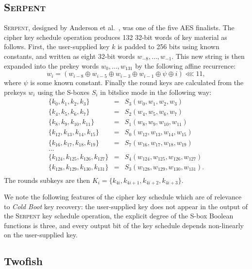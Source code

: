 \documentclass{llncs}
\newcommand{\Serpent}{\textsc{Serpent}\xspace}
\newcommand{\coldboot}{\emph{Cold Boot}\xspace}
\begin{document}
\subsection{\Serpent}
\Serpent, designed by Anderson et al.\ \cite{biham-anderson-knudsen-fse98}, was one of the five AES finalists. The cipher key schedule operation
produces 132 32-bit words of key material as follows. First, the user-supplied key $k$ is padded to 256 bits using known constants, and written as eight 32-bit words $w_{−8},\dots , w_{−1}$. This new string
is then expanded into the prekey words $w_0 ,\dots , w_{131}$ by the following affine recurrence:
$$w_i = (w_{i−8} \oplus w_{i−5} \oplus w_{i−3} \oplus w_{i−1} \oplus \psi \oplus i) \lll 11,$$ 
where $\psi$ is some known constant. Finally the round keys are calculated from the prekeys $w_i$ using the S-boxes $S_i$ in bitslice mode in the following way:
\begin{eqnarray*}
\{k_{ 0} , k_{ 1} , k_{ 2} , k_{ 3} \} &=& S_3(w_0 , w_1 , w_2 , w_3)\\
\{k_{ 4} , k_{ 5} , k_{ 6} , k_{ 7} \} &=& S_2(w_4 , w_5 , w_6 , w_7 )\\
\{k_{ 8} , k_{ 9} , k_{10} , k_{11} \} &=& S_1(w_8 , w_9 , w_{10} , w_{11} )\\
\{k_{12} , k_{13} , k_{14} , k_{15} \} &=& S_0(w_{12} , w_{13} , w_{14} , w_{15} )\\
\{k_{16} , k_{17} , k_{18} , k_{19} \} &=& S_7(w_{16} , w_{17} , w_{18} , w_{19} )\\
\dots & \\                                                                           
\{k_{124} , k_{125} , k_{126} , k_{127} \} &=& S_4 (w_{124} , w_{125} , w_{126} , w_{127} )\\
\{k_{128} , k_{129} , k_{130} , k_{131} \} &=& S_3 (w_{128} , w_{129} , w_{130} , w_{131} ).\\
\end{eqnarray*}
The rounds subkeys are then $K_i = \{k_{4i} , k_{4i+1} , k_{4i+2} , k_{4i+3}\}$. 

We note the following features of the cipher key schedule which are of relevance to \coldboot key recovery: the user-supplied key does not appear in the output of the \Serpent key schedule operation, the explicit degree of the S-box Boolean functions is three, and every output bit of the key schedule depends non-linearly on the user-supplied key.

\subsection{Twofish}
\label{subsec:twofish}
\end{document}
